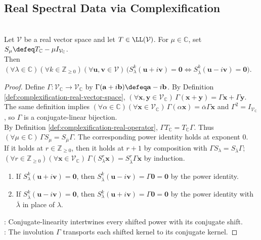 \subsection{Real Spectral Data via Complexification}

\begin{lemma} \label{lem:complexification-conjugate-generalized-eigenspaces} \\
Let $\mathcal{V}$ be a real vector space and let $T\in\LL(\mathcal{V})$. For $\mu\in\mathbb{C}$, set $S_{\mu}\defeq T_{\mathbb{C}}-\mu I_{\mathcal{V}_{\mathbb{C}}}$.\\
Then $(\forall\lambda\in\mathbb{C})(\forall k\in\mathbb{Z}_{\geq0})(\forall\mathbf{u},\mathbf{v}\in\mathcal{V})\,\bigl(S_{\lambda}^k(\mathbf{u}+i\mathbf{v})=\mathbf{0}\iff S_{\overline{\lambda}}^k(\mathbf{u}-i\mathbf{v})=\mathbf{0}\bigr)$.
\begin{proof}
Define $\Gamma:\mathcal{V}_{\mathbb{C}}\to\mathcal{V}_{\mathbb{C}}$ by $\Gamma(\mathbf{a}+i\mathbf{b})\defeq\mathbf{a}-i\mathbf{b}$. By Definition \ref{def:complexification-real-vector-space}, $(\forall\mathbf{x},\mathbf{y}\in\mathcal{V}_{\mathbb{C}})\,\Gamma(\mathbf{x}+\mathbf{y})=\Gamma\mathbf{x}+\Gamma\mathbf{y}$.\\
The same definition implies $(\forall\alpha\in\mathbb{C})(\forall\mathbf{x}\in\mathcal{V}_{\mathbb{C}})\,\Gamma(\alpha\mathbf{x})=\overline{\alpha}\Gamma\mathbf{x}$ and $\Gamma^2=I_{\mathcal{V}_{\mathbb{C}}}$, so $\Gamma$ is a conjugate-linear bijection.\\
By Definition \ref{def:complexification-real-operator}, $\Gamma T_{\mathbb{C}}=T_{\mathbb{C}}\Gamma$. Thus $(\forall\mu\in\mathbb{C})\,\Gamma S_{\mu}=S_{\overline{\mu}}\Gamma$. The corresponding power identity holds at exponent $0$.\\
If it holds at $r\in\mathbb{Z}_{\geq0}$, then it holds at $r+1$ by composition with $\Gamma S_{\lambda}=S_{\overline{\lambda}}\Gamma$; $(\forall r\in\mathbb{Z}_{\geq0})(\forall\mathbf{x}\in\mathcal{V}_{\mathbb{C}})\,\Gamma(S_{\lambda}^r\mathbf{x})=S_{\overline{\lambda}}^r\Gamma\mathbf{x}$ by induction.
\begin{enumerate}[label=\roman*.]
\setlength{\itemsep}{0pt}
\item[$(\Rightarrow)$] If $S_{\lambda}^k(\mathbf{u}+i\mathbf{v})=\mathbf{0}$, then $S_{\overline{\lambda}}^k(\mathbf{u}-i\mathbf{v})=\Gamma\mathbf{0}=\mathbf{0}$ by the power identity.
\item[$(\Leftarrow)$] If $S_{\overline{\lambda}}^k(\mathbf{u}-i\mathbf{v})=\mathbf{0}$, then $S_{\lambda}^k(\mathbf{u}+i\mathbf{v})=\Gamma\mathbf{0}=\mathbf{0}$ by the power identity with $\overline{\lambda}$ in place of $\lambda$.
\end{enumerate}
: Conjugate-linearity intertwines every shifted power with its conjugate shift.\\
: The involution $\Gamma$ transports each shifted kernel to its conjugate kernel.
\end{proof}
\end{lemma}

